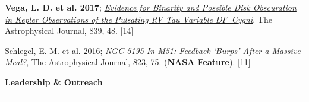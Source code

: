 \documentclass[12pt]{article}
\begin{document}
\begin{etaremune}
\item {\bf Vega, L. D. et al. 2017}; \href{https://ui.adsabs.harvard.edu/abs/2017ApJ...839...48V/abstract}{{\it Evidence for Binarity and Possible Disk Obscuration in Kepler Observations of the Pulsating RV Tau Variable DF~Cygni}}, The Astrophysical Journal, 839, 48. [14]

\item Schlegel, E. M. et al. 2016; \href{https://ui.adsabs.harvard.edu/abs/2016ApJ...823...75S/abstract}{{\it NGC 5195 In M51: Feedback ‘Burps’ After a Massive Meal?}}, The Astrophysical Journal, 823, 75. (\href{https://www.nasa.gov/mission_pages/chandra/nasa-s-chandra-finds-supermassive-black-hole-burping-nearby.html}{\bf NASA Feature}). [11]

\end{etaremune}

\noindent
{\bf Leadership \& Outreach} \\
\vspace{-10mm}
\begin{center}
\rule{\textwidth}{0.2mm}
\end{center}
\vspace{-3mm}
\end{document}
